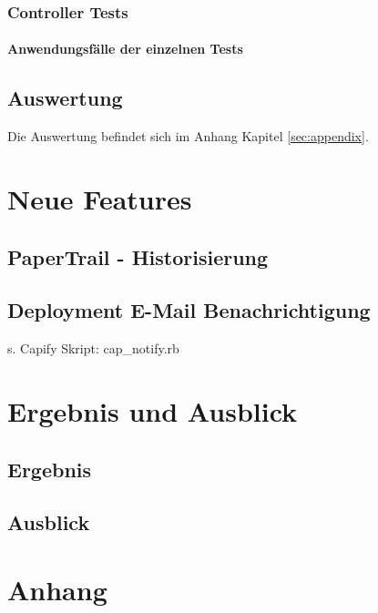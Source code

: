 \documentclass[12pt,             %
               a4paper,          %
               listof=totoc,     %
               index=totoc,      %
               bibliography=totoc,%
               oneside,         %
               BCOR1cm,          %
               english   %
               ]{scrbook}
\begin{document}
\subsection{Controller Tests}


\subsubsection{Anwendungsfälle der einzelnen Tests}

\section{Auswertung}
Die Auswertung befindet sich im Anhang Kapitel \vref{sec:appendix}.

\chapter{Neue Features}
\section{PaperTrail - Historisierung}

\clearpage

\section{Deployment E-Mail Benachrichtigung}
s. Capify Skript: \glqq cap\_notify.rb\grqq

\chapter{Ergebnis und Ausblick}
\section{Ergebnis}
\section{Ausblick}

\clearpage
\chapter{Anhang}\label{sec:appendix}


\newpage
\listoffigures

\newpage
\listoftables

\newpage
\lstlistoflistings

\newpage

\end{document}
